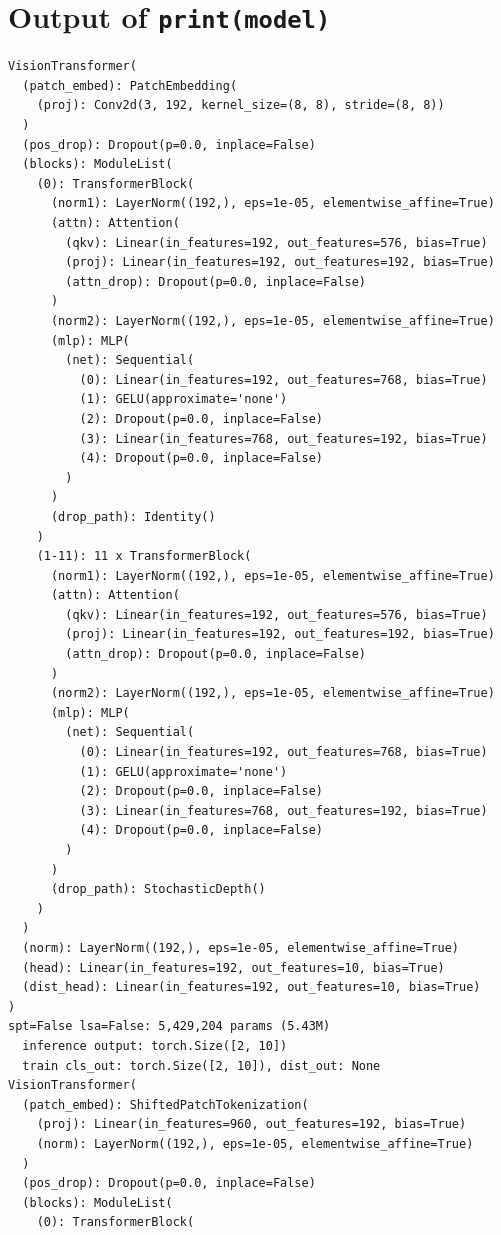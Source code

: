 \documentclass[11pt]{article}
\begin{document}
\section{Output of \texttt{print(model)}}\label{sec:output-of-print-model}
\begin{verbatim}
VisionTransformer(
  (patch_embed): PatchEmbedding(
    (proj): Conv2d(3, 192, kernel_size=(8, 8), stride=(8, 8))
  )
  (pos_drop): Dropout(p=0.0, inplace=False)
  (blocks): ModuleList(
    (0): TransformerBlock(
      (norm1): LayerNorm((192,), eps=1e-05, elementwise_affine=True)
      (attn): Attention(
        (qkv): Linear(in_features=192, out_features=576, bias=True)
        (proj): Linear(in_features=192, out_features=192, bias=True)
        (attn_drop): Dropout(p=0.0, inplace=False)
      )
      (norm2): LayerNorm((192,), eps=1e-05, elementwise_affine=True)
      (mlp): MLP(
        (net): Sequential(
          (0): Linear(in_features=192, out_features=768, bias=True)
          (1): GELU(approximate='none')
          (2): Dropout(p=0.0, inplace=False)
          (3): Linear(in_features=768, out_features=192, bias=True)
          (4): Dropout(p=0.0, inplace=False)
        )
      )
      (drop_path): Identity()
    )
    (1-11): 11 x TransformerBlock(
      (norm1): LayerNorm((192,), eps=1e-05, elementwise_affine=True)
      (attn): Attention(
        (qkv): Linear(in_features=192, out_features=576, bias=True)
        (proj): Linear(in_features=192, out_features=192, bias=True)
        (attn_drop): Dropout(p=0.0, inplace=False)
      )
      (norm2): LayerNorm((192,), eps=1e-05, elementwise_affine=True)
      (mlp): MLP(
        (net): Sequential(
          (0): Linear(in_features=192, out_features=768, bias=True)
          (1): GELU(approximate='none')
          (2): Dropout(p=0.0, inplace=False)
          (3): Linear(in_features=768, out_features=192, bias=True)
          (4): Dropout(p=0.0, inplace=False)
        )
      )
      (drop_path): StochasticDepth()
    )
  )
  (norm): LayerNorm((192,), eps=1e-05, elementwise_affine=True)
  (head): Linear(in_features=192, out_features=10, bias=True)
  (dist_head): Linear(in_features=192, out_features=10, bias=True)
)
spt=False lsa=False: 5,429,204 params (5.43M)
  inference output: torch.Size([2, 10])
  train cls_out: torch.Size([2, 10]), dist_out: None
VisionTransformer(
  (patch_embed): ShiftedPatchTokenization(
    (proj): Linear(in_features=960, out_features=192, bias=True)
    (norm): LayerNorm((192,), eps=1e-05, elementwise_affine=True)
  )
  (pos_drop): Dropout(p=0.0, inplace=False)
  (blocks): ModuleList(
    (0): TransformerBlock(

\end{verbatim}
\end{document}
